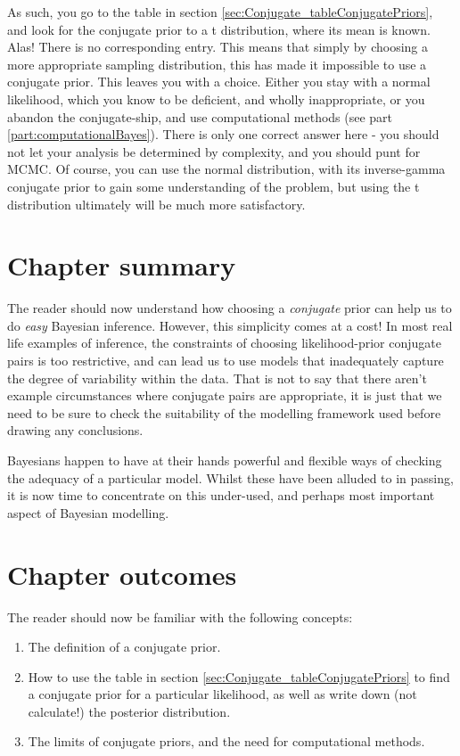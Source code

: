 \documentclass[11pt,fullpage]{book}
\begin{document}
As such, you go to the table in section \ref{sec:Conjugate_tableConjugatePriors}, and look for the conjugate prior to a t distribution, where its mean is known. Alas! There is no corresponding entry. This means that simply by choosing a more appropriate sampling distribution, this has made it impossible to use a conjugate prior. This leaves you with a choice. Either you stay with a normal likelihood, which you know to be deficient, and wholly inappropriate, or you abandon the conjugate-ship, and use computational methods (see part \ref{part:computationalBayes}). There is only one correct answer here - you should not let your analysis be determined by complexity, and you should punt for MCMC. Of course, you can use the normal distribution, with its inverse-gamma conjugate prior to gain some understanding of the problem, but using the t distribution ultimately will be much more satisfactory. 

\section{Chapter summary}
The reader should now understand how choosing a \textit{conjugate} prior can help us to do \textit{easy} Bayesian inference. However, this simplicity comes at a cost! In most real life examples of inference, the constraints of choosing likelihood-prior conjugate pairs is too restrictive, and can lead us to use models that inadequately capture the degree of variability within the data. That is not to say that there aren't example circumstances where conjugate pairs are appropriate, it is just that we need to be sure to check the suitability of the modelling framework used before drawing any conclusions.

Bayesians happen to have at their hands powerful and flexible ways of checking the adequacy of a particular model. Whilst these have been alluded to in passing, it is now time to concentrate on this under-used, and perhaps most important aspect of Bayesian modelling. 

\section{Chapter outcomes}
The reader should now be familiar with the following concepts:

\begin{enumerate}
\item The definition of a conjugate prior.
\item How to use the table in section \ref{sec:Conjugate_tableConjugatePriors} to find a conjugate prior for a particular likelihood, as well as write down (not calculate!) the posterior distribution.
\item The limits of conjugate priors, and the need for computational methods.
\end{enumerate}
\end{document}
